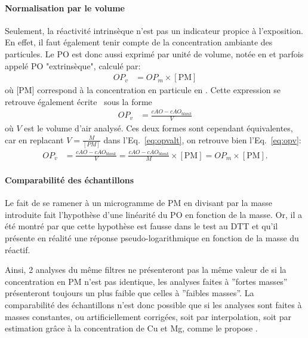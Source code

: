 \paragraph{Normalisation par le volume}%
\label{par:normalisation_par_le_volume}

Seulement, la réactivité intrinsèque n'est pas un indicateur propice à l'exposition. En
effet, il faut également tenir compte de la concentration ambiante des particules. Le PO
est donc aussi exprimé par unité de volume, notée \OPv{} en \si{\opv} et parfois appelé PO
"extrinsèque", calculé par:
\begin{align}
    \label{eq:opv}
    OP_v &= OP_m \times [\text{PM}]
\end{align}
où [PM] correspond à la concentration en particule en \si{\ugm}. Cette expression se
retrouve également écrite~\autocite{fangSemiautomated2015} sous la forme
\begin{align}
    \label{eq:opvalt}
    OP_v &= \frac{cAO - cAO_{blank}}{V}
\end{align}
où $V$ est le volume d'air analysé. Ces deux formes sont cependant équivalentes, car en
replacant $V = \frac{M}{[PM]}$ dans l'Eq.~\ref{eq:opvalt}, on retrouve bien
l'Eq.~\ref{eq:opv}:
\begin{align}
    \label{eq:opvopvalt}
    OP_v &= \frac{cAO -cAO_{blank}}{V} = \frac{cAO -cAO_{blank}}{M}\times [\text{PM}] = OP_m \times [\text{PM}].
\end{align}

\paragraph{Comparabilité des échantillons}%
\label{par:comparabilité_des_échantillons}

Le fait de se ramener à un microgramme de PM en divisant par la masse introduite fait
l'hypothèse d'une linéarité du PO en fonction de la masse. Or, il a été montré par
\textcite{charrierDithiothreitol2012,charrierBias2016,calasComparison2018} que cette
hypothèse est fausse dans le test au DTT et qu'il présente en réalité une réponse
pseudo-logarithmique en fonction de la masse du réactif.

Ainsi, 2 analyses du même filtres ne présenteront pas la même valeur de \PODTTm{} si la
concentration en PM n'est pas identique, les analyses faites à ''fortes masses''
présenteront toujours un \PODTTm{} plus faible que celles à ''faibles masses''.
La comparabilité des échantillons n'est donc possible que si les analyses sont faites à
masses constantes, ou artificiellement corrigées, soit par interpolation, soit par
estimation grâce à la concentration de Cu et Mg, comme le propose
\textcite{charrierBias2016}.

